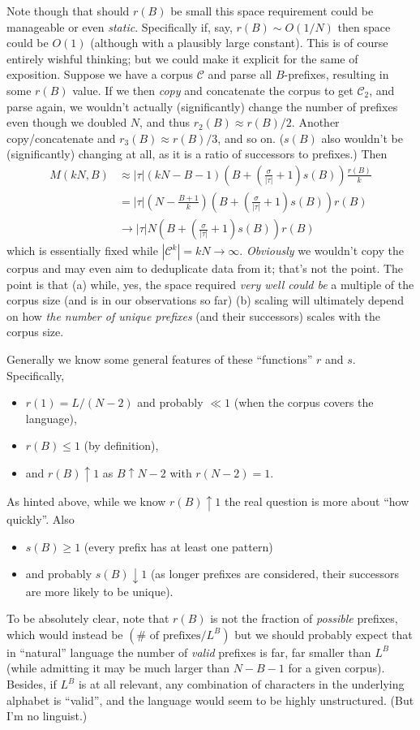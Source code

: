 \documentclass[11pt, oneside]{amsart}   	%
\begin{document}
Note though that should $r(B)$ be small this space requirement could be manageable or even {\em static}. Specifically if, say, $r(B) \sim O(1/N)$ then space could be $O(1)$ (although with a plausibly large constant). This is of course entirely wishful thinking; but we could make it explicit for the same of exposition. Suppose we have a corpus $\mathcal{C}$ and parse all $B$-prefixes, resulting in some $r(B)$ value. If we then {\em copy} and concatenate the corpus to get $\mathcal{C}_2$, and parse again, we wouldn't actually (significantly) change the number of prefixes even though we doubled $N$, and thus $r_2(B) \approx r(B)/2$. Another copy/concatenate and $r_3(B) \approx r(B)/3$, and so on. ($s(B)$ also wouldn't be (significantly) changing at all, as it is a ratio of successors to prefixes.) Then
\begin{align*}
	M(kN, B) 
		&\approx |\tau| (kN-B-1) \left( B + \left(\frac{\sigma}{|\tau|} + 1\right) s(B) \right) \frac{r(B)}{k}  \\
		&= |\tau| \left(N-\frac{B+1}{k}\right) \left( B + \left(\frac{\sigma}{|\tau|} + 1\right) s(B) \right) r(B) \\
		&\to |\tau| N \left( B + \left(\frac{\sigma}{|\tau|} + 1\right) s(B) \right) r(B)
\end{align*}
which is essentially fixed while $|\mathcal{C}^k| = k N \to \infty$. {\em Obviously} we wouldn't copy the corpus and may even aim to deduplicate data from it; that's not the point. The point is that (a) while, yes, the space required {\em very well could be} a multiple of the corpus size (and is in our observations so far) (b) scaling will ultimately depend on how {\em the number of unique prefixes} (and their successors) scales with the corpus size. 

Generally we know some general features of these ``functions'' $r$ and $s$. Specifically, 
\begin{itemize}
	\item $r(1) = L/(N-2)$ and probably $\ll 1$ (when the corpus covers the language), 
	\item $r(B) \leq 1$ (by definition), 
	\item and $r(B) \uparrow 1$ as $B \uparrow N-2$ with $r(N-2) = 1$. 
\end{itemize}
As hinted above, while we know $r(B) \uparrow 1$ the real question is more about ``how quickly''. Also 
\begin{itemize}
	\item $s(B) \geq 1$ (every prefix has at least one pattern) 
	\item and probably $s(B) \downarrow 1$ (as longer prefixes are considered, their successors are more likely to be unique). 
\end{itemize}
To be absolutely clear, note that $r(B)$ is not the fraction of {\em possible} prefixes, which would instead be $(\#\text{ of prefixes}/L^B)$ but we should probably expect that in ``natural'' language the number of {\em valid} prefixes is far, far smaller than $L^B$ (while admitting it may be much larger than $N-B-1$ for a given corpus). Besides, if $L^B$ is at all relevant, any combination of characters in the underlying alphabet is ``valid'', and the language would seem to be highly unstructured. (But I'm no linguist.) 
\end{document}
